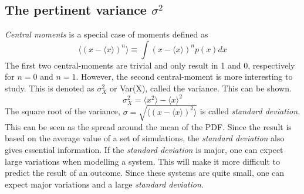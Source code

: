 \documentclass[%
twoside,                 %
final,                   %
chapterprefix=true,      %
open=right               %
10pt]{book}
\begin{document}
\subsection{The pertinent variance $\sigma ^2$}
\emph{Central moments} is a special case of moments defined as
\begin{equation}
    \langle (x-\langle x \rangle)^n \rangle \equiv \int (x-\langle x \rangle)^np(x)dx
\end{equation}
The first two central-moments are trivial and only result in 1 and 0, respectively for $n=0$ and $n=1$. However, the second central-moment is more interesting to study. This is denoted as $\sigma^2_X$ or Var(X), called the variance. This can be shown.
\begin{equation}
    \sigma^2_X  = \langle x^2\rangle -\langle x \rangle^2 
\end{equation}
The square root of the variance, $\sigma = \sqrt{\langle (x-\langle x \rangle)^2 \rangle}$ is called \emph{standard deviation}. This can be seen as the spread around the mean of the PDF. Since the result is based on the average value of a set of simulations, the \emph{standard deviation} also gives essential information. If the \emph{standard deviation} is major, one can expect large variations when modelling a system. This will make it more difficult to predict the result of an outcome. Since these systems are quite small, one can expect major variations and a large \emph{standard deviation}. 
\end{document}
